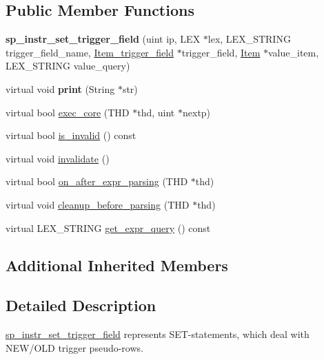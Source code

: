 \subsection*{Public Member Functions}
\begin{DoxyCompactItemize}
\item 
\mbox{\label{classsp__instr__set__trigger__field_aaa758a5f40cc0ab15689580b7ecfb340}} 
{\bfseries sp\+\_\+instr\+\_\+set\+\_\+trigger\+\_\+field} (uint ip, L\+EX $\ast$lex, L\+E\+X\+\_\+\+S\+T\+R\+I\+NG trigger\+\_\+field\+\_\+name, \mbox{\hyperlink{classItem__trigger__field}{Item\+\_\+trigger\+\_\+field}} $\ast$trigger\+\_\+field, \mbox{\hyperlink{classItem}{Item}} $\ast$value\+\_\+item, L\+E\+X\+\_\+\+S\+T\+R\+I\+NG value\+\_\+query)
\item 
\mbox{\label{classsp__instr__set__trigger__field_a12682130b4ab60efbc5942aa5627271a}} 
virtual void {\bfseries print} (String $\ast$str)
\item 
virtual bool \mbox{\hyperlink{classsp__instr__set__trigger__field_abec18ffff701e30c978cbece096e5c72}{exec\+\_\+core}} (T\+HD $\ast$thd, uint $\ast$nextp)
\item 
virtual bool \mbox{\hyperlink{classsp__instr__set__trigger__field_a8bb1d26a072313c690d91bc973d63276}{is\+\_\+invalid}} () const
\item 
virtual void \mbox{\hyperlink{classsp__instr__set__trigger__field_ab90045ba709dccc47878abc712db679f}{invalidate}} ()
\item 
virtual bool \mbox{\hyperlink{classsp__instr__set__trigger__field_ac578c371c355a3fa089ecec4872e2a59}{on\+\_\+after\+\_\+expr\+\_\+parsing}} (T\+HD $\ast$thd)
\item 
virtual void \mbox{\hyperlink{classsp__instr__set__trigger__field_a7dfa25f3120b0f312d0606c3ea9f8074}{cleanup\+\_\+before\+\_\+parsing}} (T\+HD $\ast$thd)
\item 
virtual L\+E\+X\+\_\+\+S\+T\+R\+I\+NG \mbox{\hyperlink{classsp__instr__set__trigger__field_ae10dfb93c95ef7b04ae13d4d8cc9c5fc}{get\+\_\+expr\+\_\+query}} () const
\end{DoxyCompactItemize}
\subsection*{Additional Inherited Members}


\subsection{Detailed Description}
\mbox{\hyperlink{classsp__instr__set__trigger__field}{sp\+\_\+instr\+\_\+set\+\_\+trigger\+\_\+field}} represents S\+ET-\/statements, which deal with N\+E\+W/\+O\+LD trigger pseudo-\/rows. 

